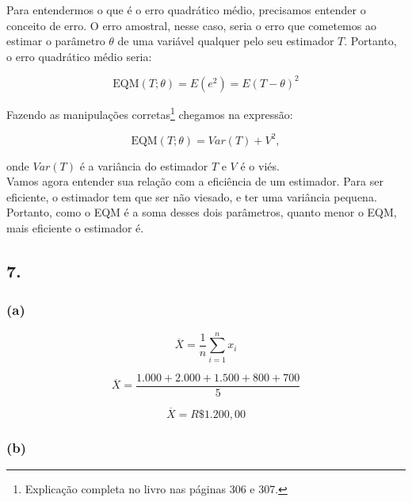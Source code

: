\documentclass[hidelinks,11pt]{book}
\theoremstyle{definition}
\begin{document}
Para entendermos o que é o erro quadrático médio, precisamos entender o conceito de erro. O erro amostral, nesse caso, seria o erro que cometemos ao estimar o parâmetro $\theta$ de uma variável qualquer pelo seu estimador $T$. Portanto, o erro quadrático médio seria:

\begin{displaymath}
	\textrm{EQM}(T; \theta) = E(e^2) = E(T - \theta)^2
\end{displaymath}

Fazendo as manipulações corretas\footnote{Explicação completa no livro \citet{m17} nas páginas 306 e 307.} chegamos na expressão:

\begin{displaymath}
	\textrm{EQM}(T; \theta) = Var(T) + V^2,
\end{displaymath}

onde $Var(T)$ é a variância do estimador $T$ e $V$ é o viés.\\

Vamos agora entender sua relação com a eficiência de um estimador. Para ser eficiente, o estimador tem que ser não viesado, e ter uma variância pequena. Portanto, como o EQM é a soma desses dois parâmetros, quanto menor o EQM, mais eficiente o estimador é.








	\subsection*{7.}


\subsubsection{(a)}

\begin{displaymath}
	\overline{X} = \frac{1}{n} \sum_{i = 1}^{n} x_i
\end{displaymath}

\begin{displaymath}
	\overline{X} = \frac{1.000 + 2.000 + 1.500 + 800 + 700}{5}
\end{displaymath}


\begin{displaymath}
	\overline{X} = R\$1.200,00
\end{displaymath}



\subsubsection{(b)}
\end{document}
